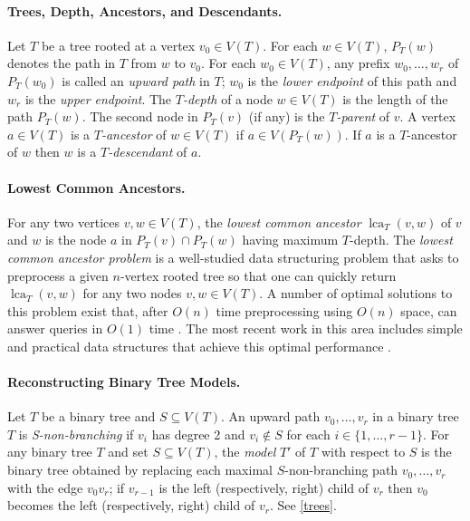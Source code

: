 \documentclass{patmorin}
\DeclareMathOperator{\lca}{lca}
\begin{document}
\paragraph*{Trees, Depth, Ancestors, and Descendants.}

Let $T$ be a tree rooted at a vertex $v_0\in V(T)$.  For each $w\in V(T)$, $P_T(w)$ denotes the path in $T$ from $w$ to $v_0$.  For each $w_0\in V(T)$, any prefix $w_0,\ldots,w_r$ of $P_T(w_0)$ is called an \emph{upward path} in $T$; $w_0$ is the \emph{lower endpoint} of this path and $w_r$ is the \emph{upper endpoint}.  The \emph{$T$-depth} of a node $w\in V(T)$ is the length of the path $P_T(w)$. The second node in $P_T(v)$ (if any) is the \emph{$T$-parent} of $v$.  A vertex $a\in V(T)$ is a \emph{$T$-ancestor} of $w\in V(T)$ if $a\in V(P_T(w))$. If $a$ is a $T$-ancestor of $w$ then $w$ is a \emph{$T$-descendant} of $a$.



\paragraph*{Lowest Common Ancestors.}

For any two vertices $v,w\in V(T)$, the \emph{lowest common ancestor} $\lca_T(v,w)$ of $v$ and $w$ is the node $a$ in $P_T(v)\cap P_T(w)$ having maximum $T$-depth.  The \emph{lowest common ancestor problem} is a well-studied data structuring problem that asks to preprocess a given $n$-vertex rooted tree so that one can quickly return $\lca_T(v,w)$ for any two nodes $v,w\in V(T)$. A number of optimal solutions to this problem exist that, after $O(n)$ time preprocessing using $O(n)$ space, can answer queries in $O(1)$ time \cite{berman.vishkin:recursive,shieber.vishkin:on,harel.tarjan:fast,alstrup.gavoille.ea:nearest,bender.farach-colton:lca,fischer.heun:theoretical}.  The most recent work in this area includes simple and practical data structures that achieve this optimal performance \cite{alstrup.gavoille.ea:nearest,bender.farach-colton:lca,fischer.heun:theoretical}.

\paragraph*{Reconstructing Binary Tree Models.}

Let $T$ be a binary tree and $S \subseteq V(T)$. An upward path $v_0,\ldots,v_r$ in a binary tree $T$ is \emph{S-non-branching} if $v_{i}$ has degree 2 and $v_i \notin S$ for each $i\in\{1,\ldots,r-1\}$. For any binary tree $T$ and set $S \subseteq V(T)$, the \emph{model} $T'$ of $T$ with respect to $S$ is the binary tree obtained by replacing each maximal $S$-non-branching path $v_0,\ldots,v_r$ with the edge $v_0v_r$; if $v_{r-1}$ is the left (respectively, right) child of $v_r$ then $v_0$ becomes the left (respectively, right) child of $v_r$. See \cref{trees}.
\end{document}
